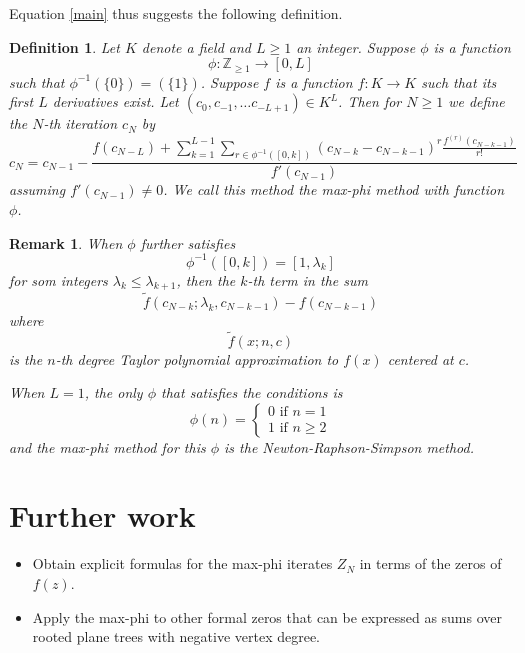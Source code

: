 \documentclass[11pt, oneside]{article}   	%
\newtheorem{definition}{Definition}
\newtheorem{remark}{Remark}
\begin{document}
Equation \eqref{main} thus suggests the following definition. 
\begin{definition} \label{d maxphi}
Let $K$ denote a field and $L \geq 1$ an integer. Suppose $\phi$ is a function 
\[
\phi \colon \mathbb{Z}_{\geq 1} \rightarrow   [0,L]
\]
such that $\phi^{-1}(\{ 0\} ) = (\{ 1\})$. Suppose $f$ is a function $f \colon K \rightarrow  K$ such that its first $L$ derivatives exist. Let $(c_0, c_{-1}, \ldots c_{-L+1}) \in K^L$. 
Then for $N \geq 1$ we define the $N$-th iteration $c_N$ by 
\[
c_N = c_{N-1} - \frac{f(c_{N-L})+ \sum_{k=1}^{L-1} \sum_{r \in \phi^{-1}([0,k])} (c_{N-k} - c_{N-k-1})^r \frac{f^{(r)}(c_{N-k-1})}{r!}}{f'(c_{N-1})}
\] 
assuming $f'(c_{N-1} )\neq 0$. We call this method the \emph{max-phi} method with function $\phi$. 
\end{definition}

\begin{remark} 
When $\phi$ further satisfies 
\[
\phi^{-1}([0,k]) = [1,\lambda_k]
\]
for som integers $\lambda_k \leq \lambda_{k+1}$, then the $k$-th term in the sum  
\[
\tilde{f}(c_{N-k}; \lambda_k, c_{N-k-1}) - f(c_{N-k-1})
\] 
where 
\[
\tilde{f}(x; n, c)
\]
is the $n$-th degree Taylor polynomial approximation to $f(x)$ centered at $c$. 

When $L=1$, the only $\phi$ that satisfies the conditions is 
\[
\phi(n) = \begin{cases} 0 \text{ if } n=1 \\ 
1 \text{ if }  n \geq 2
\end{cases} 
\]
and the max-phi method for this $\phi$ is the Newton-Raphson-Simpson method. 
\end{remark} 

\section{Further work}

\begin{itemize} 

\item Obtain explicit formulas for the max-phi iterates $Z_N$ in terms of the zeros of $f(z)$. 

\item Apply the max-phi to other formal zeros that can be expressed as sums over rooted plane trees with negative vertex degree. 

\end{itemize} 
\end{document}
